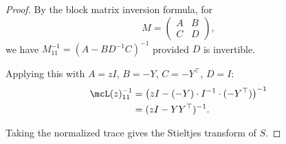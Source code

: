 \begin{proof}
By the block matrix inversion formula, for
\[
M = \begin{pmatrix} A & B \\ C & D \end{pmatrix},
\]
we have $M^{-1}_{11} = (A - BD^{-1}C)^{-1}$ provided $D$ is invertible.

Applying this with $A = zI$, $B = -Y$, $C = -Y^\top$, $D = I$:
\begin{align}
\mcL(z)^{-1}_{11}
&= \bigl(zI - (-Y) \cdot I^{-1} \cdot (-Y^\top)\bigr)^{-1} \\
&= (zI - YY^\top)^{-1}.
\end{align}

Taking the normalized trace gives the Stieltjes transform of $S$.
\end{proof}
